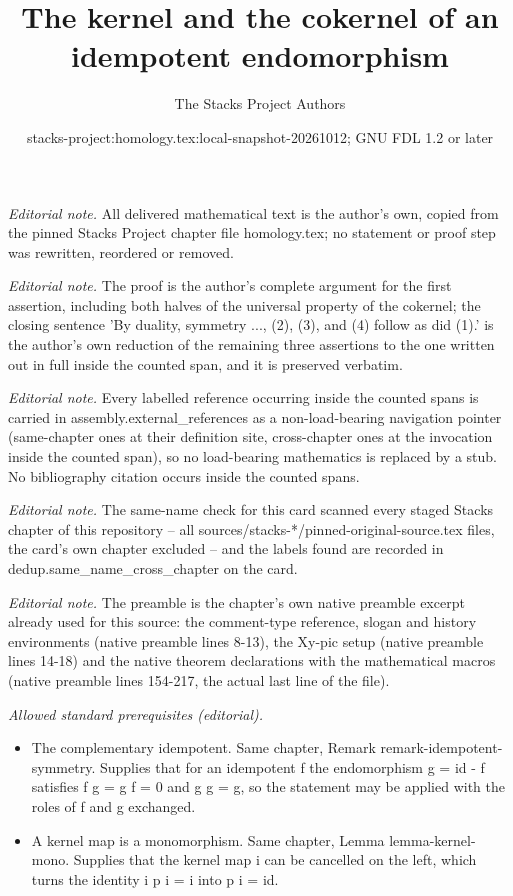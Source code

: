\documentclass[10pt,a4paper]{amsart}
\title{The kernel and the cokernel of an idempotent endomorphism}
\author{The Stacks Project Authors}
\date{stacks-project:homology.tex:local-snapshot-20261012; GNU FDL 1.2 or later}
\theoremstyle{plain}
\theoremstyle{definition}
\theoremstyle{remark}
\numberwithin{equation}{subsection}
\begin{document}
\maketitle
\noindent\textit{Editorial note.} All delivered mathematical text is the author's own, copied from the pinned Stacks Project chapter file homology.tex; no statement or proof step was rewritten, reordered or removed.\par\medskip
\noindent\textit{Editorial note.} The proof is the author's complete argument for the first assertion, including both halves of the universal property of the cokernel; the closing sentence 'By duality, symmetry ..., (2), (3), and (4) follow as did (1).' is the author's own reduction of the remaining three assertions to the one written out in full inside the counted span, and it is preserved verbatim.\par\medskip
\noindent\textit{Editorial note.} Every labelled reference occurring inside the counted spans is carried in assembly.external\_references as a non-load-bearing navigation pointer (same-chapter ones at their definition site, cross-chapter ones at the invocation inside the counted span), so no load-bearing mathematics is replaced by a stub. No bibliography citation occurs inside the counted spans.\par\medskip
\noindent\textit{Editorial note.} The same-name check for this card scanned every staged Stacks chapter of this repository -- all sources/stacks-*/pinned-original-source.tex files, the card's own chapter excluded -- and the labels found are recorded in dedup.same\_name\_cross\_chapter on the card.\par\medskip
\noindent\textit{Editorial note.} The preamble is the chapter's own native preamble excerpt already used for this source: the comment-type reference, slogan and history environments (native preamble lines 8-13), the Xy-pic setup (native preamble lines 14-18) and the native theorem declarations with the mathematical macros (native preamble lines 154-217, the actual last line of the file).\par\medskip
\noindent\textit{Allowed standard prerequisites (editorial).}\begin{itemize}
\item The complementary idempotent. Same chapter, Remark remark-idempotent-symmetry. Supplies that for an idempotent f the endomorphism g = id - f satisfies f g = g f = 0 and g g = g, so the statement may be applied with the roles of f and g exchanged.
\item A kernel map is a monomorphism. Same chapter, Lemma lemma-kernel-mono. Supplies that the kernel map i can be cancelled on the left, which turns the identity i p i = i into p i = id.
\end{itemize}\medskip
\end{document}
